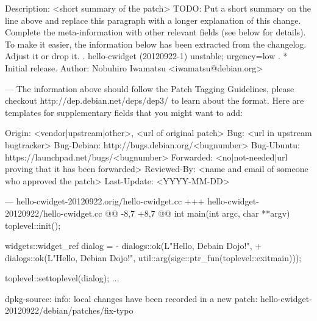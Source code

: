 \documentclass[mingoth,a4paper]{jsarticle}
\begin{document}

\begin{commandline}
Description: <short summary of the patch>
 TODO: Put a short summary on the line above and replace this paragraph
 with a longer explanation of this change. Complete the meta-information
 with other relevant fields (see below for details). To make it easier, the 
 information below has been extracted from the changelog. Adjust it or drop
 it. 
 .
 hello-cwidget (20120922-1) unstable; urgency=low
 .
   * Initial release.
Author: Nobuhiro Iwamatsu <iwamatsu@debian.org>

---
The information above should follow the Patch Tagging Guidelines, please
checkout http://dep.debian.net/deps/dep3/ to learn about the format. Here
are templates for supplementary fields that you might want to add:

Origin: <vendor|upstream|other>, <url of original patch>
Bug: <url in upstream bugtracker>
Bug-Debian: http://bugs.debian.org/<bugnumber>
Bug-Ubuntu: https://launchpad.net/bugs/<bugnumber>
Forwarded: <no|not-needed|url proving that it has been forwarded>
Reviewed-By: <name and email of someone who approved the patch>
Last-Update: <YYYY-MM-DD>

--- hello-cwidget-20120922.orig/hello-cwidget.cc
+++ hello-cwidget-20120922/hello-cwidget.cc
@@ -8,7 +8,7 @@ int main(int argc, char **argv)
    toplevel::init();
 
    widgets::widget_ref dialog =
-       dialogs::ok(L"Hello, Debain Dojo!",
+       dialogs::ok(L"Hello, Debian Dojo!",
            util::arg(sigc::ptr_fun(toplevel::exitmain)));
 
    toplevel::settoplevel(dialog);
...

dpkg-source: info: local changes have been recorded in a new patch: hello-cwidget-20120922/debian/patches/fix-typo
\end{commandline}
\end{document}
